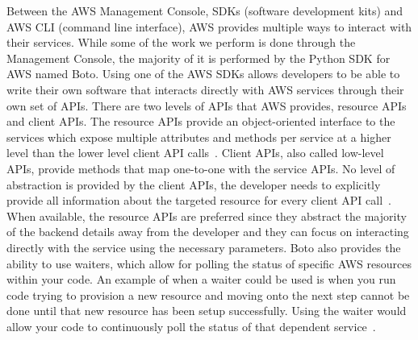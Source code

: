 Between the AWS Management Console, SDKs (software development kits) and AWS 
CLI (command line interface), AWS provides multiple ways to interact with 
their services. While some of the work we perform is done through the 
Management Console, the majority of it is performed by the Python SDK for AWS 
named Boto. Using one of the AWS SDKs allows developers to be able to write 
their own software that interacts directly with AWS services through their own 
set of APIs. There are two levels of APIs that AWS provides, resource APIs and 
client APIs. The resource APIs provide an object-oriented interface to the 
services which expose multiple attributes and methods per service at a higher 
level than the lower level client API calls~\cite{hid-sp18-521-BotoResources}. 
Client APIs, also called low-level APIs, provide methods that map one-to-one 
with the service APIs. No level of abstraction is provided by the client 
APIs, the developer needs to explicitly provide all information about the 
targeted resource for every client API call~\cite{hid-sp18-521-BotoClients}. 
When available, the resource APIs are preferred since they abstract the 
majority of the backend details away from the developer and they can focus on 
interacting directly with the service using the necessary parameters. Boto 
also provides the ability to use waiters, which allow for polling the status 
of specific AWS resources within your code. An example of when a waiter could 
be used is when you run code trying to provision a new resource and moving 
onto the next step cannot be done until that new resource has been setup 
successfully. Using the waiter would allow your code to continuously poll the 
status of that dependent service~\cite{hid-sp18-521-pythonsdk}.



 

